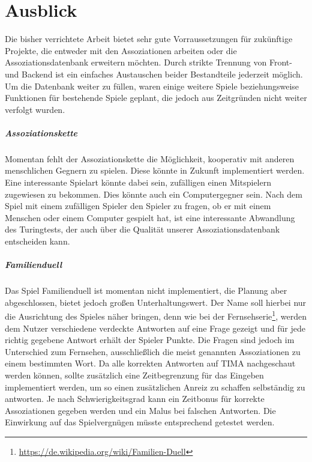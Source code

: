 \chapter{Ausblick}\label{ch:ausblick}

Die bisher verrichtete Arbeit bietet sehr gute Vorraussetzungen für zukünftige Projekte, die entweder mit den Assoziationen arbeiten oder die Assoziationsdatenbank erweitern möchten. Durch strikte Trennung von Front- und Backend ist ein einfaches Austauschen beider Bestandteile jederzeit möglich.
Um die Datenbank weiter zu füllen, waren einige weitere Spiele beziehungsweise Funktionen für bestehende Spiele geplant, die jedoch aus Zeitgründen nicht weiter verfolgt wurden.

\paragraph{Assoziationskette}
Momentan fehlt der Assoziationskette die Möglichkeit, kooperativ mit anderen menschlichen Gegnern zu spielen. Diese könnte in Zukunft implementiert werden. Eine interessante Spielart könnte dabei sein, zufälligen einen Mitspielern zugewiesen zu bekommen. Dies könnte auch ein Computergegner sein. Nach dem Spiel mit einem zufälligen Spieler den Spieler zu fragen, ob er mit einem Menschen oder einem Computer gespielt hat, ist eine interessante Abwandlung des Turingtests, der auch über die Qualität unserer Assoziationsdatenbank entscheiden kann.

\paragraph{Familienduell}
Das Spiel Familienduell ist momentan nicht implementiert, die Planung aber abgeschlossen, bietet jedoch großen Unterhaltungswert. Der Name soll hierbei nur die Ausrichtung des Spieles näher bringen,
denn wie bei der
Fernsehserie\footnote{\url{https://de.wikipedia.org/wiki/Familien-Duell}},
werden dem Nutzer verschiedene verdeckte Antworten auf eine Frage gezeigt
und für jede richtig gegebene Antwort erhält der Spieler Punkte.
Die Fragen sind jedoch im Unterschied zum Fernsehen, ausschließlich die meist
genannten Assoziationen zu einem bestimmten Wort. Da alle korrekten Antworten auf TIMA
nachgeschaut werden können, sollte zusätzlich eine
Zeitbegrenzung für das Eingeben implementiert werden, um so einen zusätzlichen Anreiz zu schaffen selbständig zu antworten. Je nach Schwierigkeitsgrad kann ein Zeitbonus für korrekte Assoziationen
gegeben werden und ein Malus bei falschen Antworten. Die Einwirkung auf das
Spielvergnügen müsste entsprechend getestet werden.


